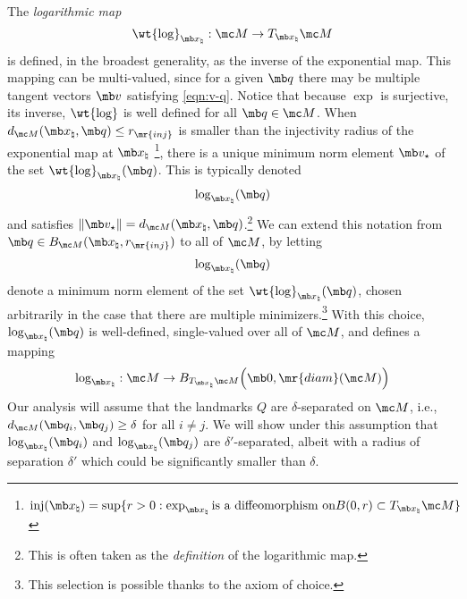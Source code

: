 {The {\em logarithmic map}
\begin{equation}
    \wt{\log}_{\mb x_\natural}  : \mc M \to T_{\mb x_\natural} \mc M
\end{equation}
is defined, in the broadest generality, as the inverse of the exponential map. This mapping can be multi-valued, since for a given $\mb q$ there may be multiple tangent vectors $\mb v$ satisfying \eqref{eqn:v-q}. Notice that because $\exp$ is surjective, its inverse, $\wt{\log}$ is well defined for all $\mb q \in \mc M$. When $d_{\mc M}(\mb x_\natural,\mb q) \le r_{\mr{inj}}$ is smaller than the injectivity radius of the exponential map at $\mb x_\natural$ \footnote{$\text{inj}(\mb x_\natural) = \sup \{r >0 :\exp_{\mb x_\natural} \text{is a diffeomorphism on} B(0,r) \subset T_{\mb x_\natural}\mc M\}$}, there is a unique minimum norm element $\mb v_\star$ of the set $\wt{\log}_{\mb x_\natural}(\mb q)$. This is typically denoted 
\begin{equation}
    \log_{\mb x_\natural}(\mb q)
\end{equation}
and satisfies $\| \mb v_\star \| = d_{\mc M}(\mb x_\natural, \mb q )$.\footnote{This is often taken as the {\em definition} of the logarithmic map.} We can extend this notation from $\mb q \in B_{\mc M}(\mb x_\natural, r_{\mr{inj}})$ to all of $\mc M$, by letting 
\begin{equation}
    \log_{\mb x_\natural}(\mb q)
\end{equation}
denote a minimum norm element of the set $\wt{\log}_{\mb x_\natural}(\mb q)$, chosen arbitrarily in the case that there are multiple minimizers.\footnote{This selection is possible thanks to the axiom of choice.} With this choice, $\log_{\mb x_\natural}(\mb q)$ is well-defined, single-valued over all of $\mc M$, and defines a mapping 
\begin{equation}
    \log_{\mb x_\natural} : \mc M \to B_{T_{\mb x_\natural} \mc M} \Bigl( \mb 0, \mr{diam}(\mc M) \Bigr ) 
\end{equation}
Our analysis will assume that the landmarks $Q$ are $\delta$-separated on $\mc M$, i.e., $d_{\mc M}(\mb q_i, \mb q_j) \ge \delta$ for all $i \ne j$. We will show under this assumption that $\log_{\mb x_\natural}(\mb q_i)$ and $\log_{\mb x_\natural}(\mb q_j)$ are  $\delta'$-separated, albeit with a radius of separation $\delta'$ which could be significantly smaller than $\delta$. 

}
